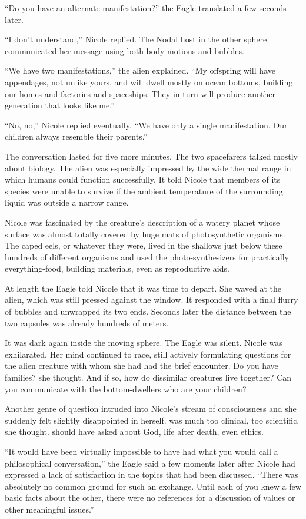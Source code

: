 \documentclass[]{article}
\begin{document}
{“Do you have an alternate manifestation?” the Eagle translated a few seconds later.

“I don’t understand,” Nicole replied. The Nodal host in the other sphere communicated her message using both body motions and bubbles.

“We have two manifestations,” the alien explained. “My offspring will have appendages, not unlike yours, and will dwell mostly on ocean bottoms, building our homes and factories and spaceships. They in turn will produce another generation that looks like me.”

“No, no,” Nicole replied eventually. “We have only a single manifestation. Our children always resemble their parents.”

The conversation lasted for five more minutes. The two spacefarers talked mostly about biology. The alien was especially impressed by the wide thermal range in which humans could function successfully. It told Nicole that members of its species were unable to survive if the ambient temperature of the surrounding liquid was outside a narrow range.

Nicole was fascinated by the creature’s description of a watery planet whose surface was almost totally covered by huge mats of photosynthetic organisms. The caped eels, or whatever they were, lived in the shallows just below these hundreds of different organisms and used the photo-synthesizers for practically everything-food, building materials, even as reproductive aids.

At length the Eagle told Nicole that it was time to depart. She waved at the alien, which was still pressed against the window. It responded with a final flurry of bubbles and unwrapped its two ends. Seconds later the distance between the two capsules was already hundreds of meters.

It was dark again inside the moving sphere. The Eagle was silent. Nicole was exhilarated. Her mind continued to race, still actively formulating questions for the alien creature with whom she had had the brief encounter. Do you have families? she thought. And if so, how do dissimilar creatures live together? Can you communicate with the bottom-dwellers who are your children?

Another genre of question intruded into Nicole’s stream of consciousness and she suddenly felt slightly disappointed in herself. was much too clinical, too scientific, she thought. should have asked about God, life after death, even ethics.

“It would have been virtually impossible to have had what you would call a philosophical conversation,” the Eagle said a few moments later after Nicole had expressed a lack of satisfaction in the topics that had been discussed. “There was absolutely no common ground for such an exchange. Until each of you knew a few basic facts about the other, there were no references for a discussion of values or other meaningful issues.”

}
\end{document}
